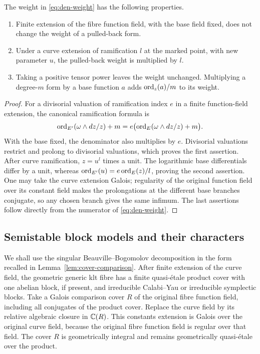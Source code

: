 \begin{lemma}\label{lem:den-weight-rules}
The weight in \eqref{eq:den-weight} has the following properties.
\begin{enumerate}
\item Finite extension of the fibre function field, with the base
field fixed, does not change the weight of a pulled-back form.
\item Under a curve extension of ramification $l$ at the marked
point, with new parameter $u$, the pulled-back weight is multiplied
by $l$.
\item Taking a positive tensor power leaves the weight unchanged.
Multiplying a degree-$m$ form by a base function $a$ adds
$\operatorname{ord}_z(a)/m$ to its weight.
\end{enumerate}
\end{lemma}

\begin{proof}
For a divisorial valuation of ramification index $e$ in a finite
function-field extension, the canonical ramification formula is
\[
 \operatorname{ord}_{E'}(\omega\wedge dz/z)+m
   =e\bigl(\operatorname{ord}_E(\omega\wedge dz/z)+m\bigr).
\]
With the base fixed, the denominator also multiplies by $e$.
Divisorial valuations restrict and prolong to divisorial valuations,
which proves the first assertion.  After curve ramification,
$z=u^l$ times a unit.  The logarithmic base differentials differ by
a unit, whereas $\operatorname{ord}_{E'}(u)=e\operatorname{ord}_E(z)/l$, proving the second
assertion.  One may take the curve extension Galois; regularity of
the original function field over its constant field makes the
prolongations at the different base branches conjugate, so any
chosen branch gives the same infimum.  The last assertions follow
directly from the numerator of \eqref{eq:den-weight}.
\end{proof}

\subsection{Semistable block models and their characters}

We shall use the singular Beauville--Bogomolov decomposition in the
form recalled in Lemma~\ref{lem:cover-comparison}.  After finite
extension of the curve field, the geometric generic klt fibre has a
finite quasi-\'etale product cover with one abelian block, if present,
and irreducible Calabi--Yau or irreducible symplectic blocks.  Take a
Galois comparison cover $R$ of the original fibre function field,
including all conjugates of the product cover.  Replace the curve
field by its relative algebraic closure in $\mathbb C(R)$.  This constants
extension is Galois over the original curve field, because the
original fibre function field is regular over that field.  The cover
$R$ is geometrically integral and remains geometrically quasi-\'etale
over the product.

